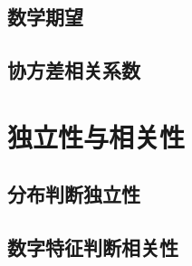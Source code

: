 \documentclass[UTF8, 12pt]{ctexart}
\begin{document}
\subsection{数学期望}

\subsection{协方差相关系数}

\section{独立性与相关性}

\subsection{分布判断独立性}

\subsection{数字特征判断相关性}
\end{document}
